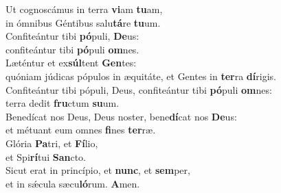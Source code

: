 \evenverse Ut cognoscámus in terra \textbf{vi}am \textbf{tu}am,~\*\\
\evenverse in ómnibus Géntibus salu\textbf{tá}re \textbf{tu}um.\\
\oddverse Confiteántur tibi \textbf{pó}puli, \textbf{De}us:~\*\\
\oddverse confiteántur tibi \textbf{pó}puli \textbf{om}nes.\\
\evenverse Læténtur et ex\textbf{súl}tent \textbf{Gen}tes:~\*\\
\evenverse quóniam júdicas pópulos in æquitáte, et Gentes in \textbf{ter}ra \textbf{dí}rigis.\\
\oddverse Confiteántur tibi pópuli, Deus, confiteántur tibi \textbf{pó}puli \textbf{om}nes:~\*\\
\oddverse terra dedit \textbf{fru}ctum \textbf{su}um.\\
\evenverse Benedícat nos Deus, Deus noster, bene\textbf{dí}cat nos \textbf{De}us:~\*\\
\evenverse et métuant eum omnes \textbf{fi}nes \textbf{ter}ræ.\\
\oddverse Glória \textbf{Pa}tri, et \textbf{Fí}lio,~\*\\
\oddverse et Spi\textbf{rí}tui \textbf{San}cto.\\
\evenverse Sicut erat in princípio, et \textbf{nunc}, et \textbf{sem}per,~\*\\
\evenverse et in sǽcula sæcu\textbf{ló}rum. \textbf{A}men.\\
